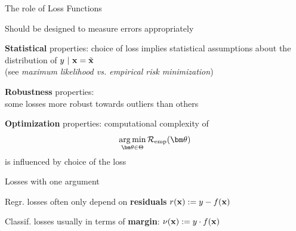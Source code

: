 \documentclass[11pt,compress,t,notes=noshow, xcolor=table]{beamer}
\begin{document}

\begin{framei}[sep=L]{The role of Loss Functions}

\item Should be designed to measure errors appropriately

\item \textbf{Statistical} properties: choice of loss implies statistical assumptions about the distribution of $y ~|~ \mathbf{x} = \tilde{\mathbf{x}}$ \\
(see \emph{maximum likelihood vs. empirical risk minimization})
\item \textbf{Robustness} properties: \\
some losses more robust towards outliers than others
\item \textbf{Optimization} properties: computational complexity of
$$
\argmint \risket
$$
is influenced by choice of the loss 

\end{framei}



\begin{framei}[sep=M]{Losses with one argument}


\item Regr. losses often only depend on  \textbf{residuals} 
$r(\mathbf{x}) := y - f(\mathbf{x})$

\item Classif. losses usually in terms of 
\textbf{margin}: $\nu(\mathbf{x})  := y \cdot f(\mathbf{x})$

\vfill


\end{framei}
\end{document}

